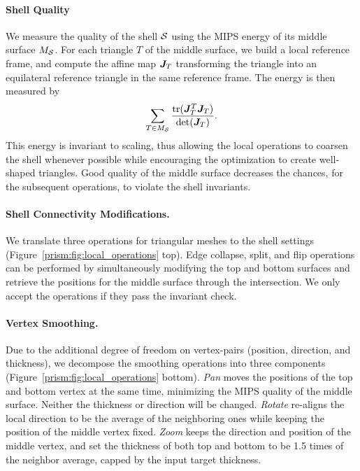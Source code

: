 \paragraph{Shell Quality}
We measure the quality of the shell $\S$ using the MIPS energy \cite{hormann2000mips} of its middle surface $M_\S$. For each triangle $T$ of the middle surface, we build a local reference frame, and  compute the affine map $\J_T$ transforming the triangle into an equilateral reference triangle in the same reference frame. The energy is then measured by
\begin{equation*}
    \sum_{T \in M_\S} \frac{\tr(\J_T^T\J_T)}{\det(\J_T)}.
\end{equation*}
This energy is invariant to scaling, thus allowing the local operations to coarsen the shell whenever possible while  encouraging the optimization to create well-shaped triangles. Good quality of the middle surface decreases the chances, for the subsequent operations, to violate the shell invariants.

\paragraph{Shell Connectivity Modifications.} We translate three operations for triangular meshes to the shell settings (Figure~\ref{prism:fig:local_operations} top). Edge collapse, split, and flip operations can be performed by simultaneously modifying the top and bottom surfaces
and retrieve the positions for the middle surface through the intersection. We only accept the operations if they pass the invariant check.

\paragraph{Vertex Smoothing.} Due to the additional degree of freedom on vertex-pairs (position, direction, and thickness), we decompose the smoothing operations into three {components} (Figure~\ref{prism:fig:local_operations} bottom). 
\emph{Pan} moves the positions of the top and bottom vertex at the same time, 
minimizing the MIPS quality of the middle surface. Neither the thickness or direction will be changed. 
\emph{Rotate} re-aligns the local direction to be the average of the neighboring ones while keeping the position of the middle vertex fixed. 
\emph{Zoom} keeps the direction and position of the middle vertex, and set the thickness of both top and bottom to be 1.5 times of the neighbor average, capped by the input target thickness.


